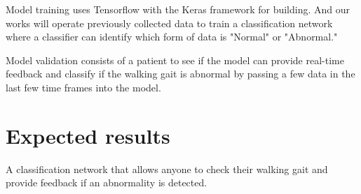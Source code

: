 \documentclass[10pt,twocolumn,letterpaper]{article}
\begin{document}
Model training uses Tensorflow with the Keras framework for building. And our works will operate previously collected data to train a classification network where a classifier can identify which form of data is "Normal" or "Abnormal."

Model validation consists of a patient to see if the model can provide real-time feedback and classify if the walking gait is abnormal by passing a few data in the last few time frames into the model.

\section{Expected results}

A classification network that allows anyone to check their walking gait and provide feedback if an abnormality is detected.

{\small


}
\end{document}
